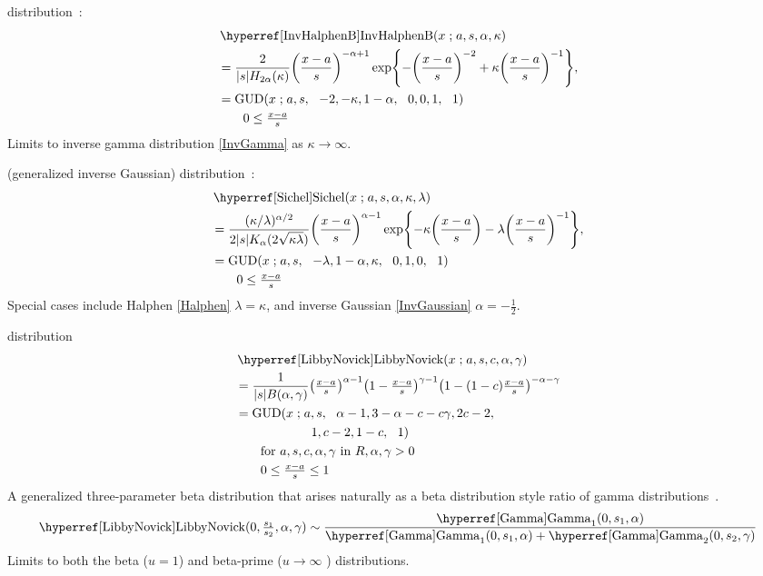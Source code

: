  distribution~\cite{Morlat1956a,Perreault1999}:
\begin{align}
\label{InvHalphenB}
&\opr{InvHalphenB}(x\given a,s, \alpha, \kappa)
\\
&= \frac{2}{|s| H_{2\alpha}(\kappa)} \Left(\frac{x-a}{s}\Right)^{-\alpha+1} 
\exp\Left\{- \Left(\frac{x-a}{s}\Right)^{-2} +\kappa \Left(\frac{x-a}{s}\Right)^{-1}\Right\},
\checked
\notag
\\
& = \op{GUD}(x \given a,s\sep -2, -\kappa, 1-\alpha\sep 0,0,1\sep1) \checked
\notag
\\& \qquad  0 \leq \tfrac{x-a}{s}
\notag
\end{align}
Limits to inverse gamma distribution \eqref{InvGamma} as $\kappa \rightarrow \infty$.

 (generalized inverse Gaussian) distribution~\cite{Good1953, Sichel1973, Barndorff-Nielsen1977}:
\begin{align}
\label{Sichel}
&\opr{Sichel}(x\given a,s, \alpha, \kappa, \lambda)
\\
&= \frac{(\kappa/\lambda)^{\alpha/2} }{2 |s| K_{\alpha} (2\sqrt{\kappa\lambda})} \Left(\frac{x-a}{s}\Right)^{\alpha-1} 
\exp\Left\{-\kappa \Left(\frac{x-a}{s}\Right) -\lambda \Left(\frac{x-a}{s}\Right)^{-1}\Right\},
\notag
\checked
\\
& = \op{GUD}(x \given a,s \sep -\lambda, 1-\alpha , \kappa \sep 0,1,0 \sep 1)
\notag
\\& \qquad  0 \leq \tfrac{x-a}{s} \notag
\end{align}
Special cases include Halphen \eqref{Halphen} $\lambda= \kappa$, and inverse Gaussian \eqref{InvGaussian} $\alpha = -\tfrac{1}{2}$.




 distribution~\cite{Libby1982a, McDonald1995, Sarabia2006, Nadarajah2007}
\begin{align}
\label{LibbyNovick}
&\opr{LibbyNovick}(x\given a,s,c,\alpha,\gamma)
\\ \notag
&=  \frac{1}{|s| B(\alpha,\gamma)}
\Left(\tfrac{x-a}{s}\Right)^{\alpha-1}  \Left(1-\tfrac{x-a}{s}\Right)^{\gamma-1} \Left(1- (1-c) \tfrac{x-a}{s}\Right)^{-\alpha-\gamma}
\checked
\notag
\\ \notag
& = \op{GUD}(x\given a,s\sep \alpha-1, 3-\alpha - c - c\gamma, 2c-2\sep
\\ \notag & \qquad\qquad\qquad 1, c-2, 1-c\sep 1) \checked
\\ \notag
& \qquad \text{for } a,s,c,\alpha,\gamma  \text{ in } {R},  \alpha,\gamma  >0
\\ \notag
& \qquad 0\leq \tfrac{x-a}{s} \leq1
\end{align}
A generalized three-parameter beta distribution that arises naturally as a beta distribution style ratio of gamma distributions~\cite{Sarabia2006}. 
\[
\opr{LibbyNovick}(0, \tfrac{s_1}{s_2}, \alpha, \gamma) \sim \frac{\opr{Gamma}_1(0, s_1,\alpha)} { \opr{Gamma}_1(0, s_1,\alpha) + \opr{Gamma}_2(0, s_2,\gamma) }
\notag
\checked
\]
Limits to both the beta ($u=1$) and beta-prime ($u\rightarrow \infty$ ) distributions. 

